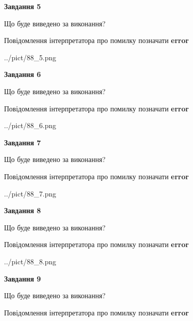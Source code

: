 \documentclass[11pt, ukrainian]{article}
\begin{document}
{\begin {large}
{\begin {center}\textbf{Завдання 5}\end {center}}\par
Що буде виведено за виконання? \par
Повідомлення інтерпретатора про помилку позначати \textbf{error}

\begin{center}
	{../pict/88_5.png}
\end{center}
\newpage

{\begin {center}\textbf{Завдання 6}\end {center}}\par
Що буде виведено за виконання? \par
Повідомлення інтерпретатора про помилку позначати \textbf{error}

\begin{center}
	{../pict/88_6.png}
\end{center}
\newpage

{\begin {center}\textbf{Завдання 7}\end {center}}\par
Що буде виведено за виконання? \par
Повідомлення інтерпретатора про помилку позначати \textbf{error}

\begin{center}
	{../pict/88_7.png}
\end{center}
\newpage

{\begin {center}\textbf{Завдання 8}\end {center}}\par
Що буде виведено за виконання? \par
Повідомлення інтерпретатора про помилку позначати \textbf{error}

\begin{center}
	{../pict/88_8.png}
\end{center}
\newpage

{\begin {center}\textbf{Завдання 9}\end {center}}\par
Що буде виведено за виконання? \par
Повідомлення інтерпретатора про помилку позначати \textbf{error}


\end{large}}
\end{document}
